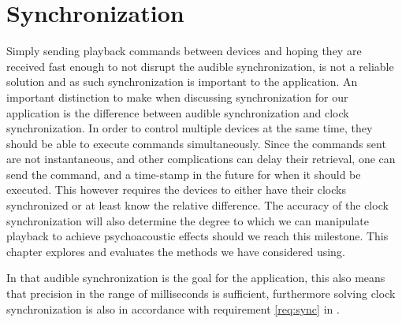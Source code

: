 \chapter{Synchronization}
Simply sending playback commands between devices and hoping they are received fast enough to not disrupt the audible synchronization, is not a reliable solution and as such synchronization is important to the application.
An important distinction to make when discussing synchronization for our application is the difference between audible synchronization and clock synchronization.
In order to control multiple devices at the same time, they should be able to execute commands simultaneously. 
Since the commands sent are not instantaneous, and other complications can delay their retrieval, one can send the command, and a time-stamp in the future for when it should be executed.
This however requires the devices to either have their clocks synchronized or at least know the relative difference. 
The accuracy of the clock synchronization will also determine the degree to which we can manipulate playback to achieve psychoacoustic effects should we reach this milestone.
This chapter explores and evaluates the methods we have considered using.

In that audible synchronization is the goal for the application, this also means that precision in the range of milliseconds is sufficient, furthermore solving clock synchronization is also in accordance with requirement \ref{req:sync} in .

